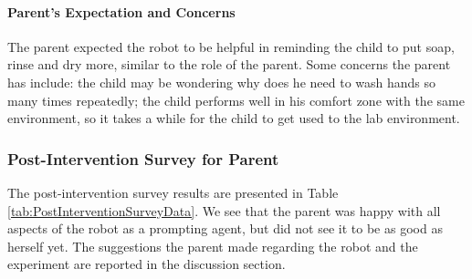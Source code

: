 \documentclass{ut-thesis}
\begin{document}
\paragraph{Parent's Expectation and Concerns}
The parent expected the robot to be helpful in reminding the child to put soap, rinse and dry more, similar to the role of the parent.  Some concerns the parent has include: the child may be wondering why does he need to wash hands so many times repeatedly; the child performs well in his comfort zone with the same environment, so it takes a while for the child to get used to the lab environment.


\subsubsection{Post-Intervention Survey for Parent}
The post-intervention survey results are presented in Table \ref{tab:PostInterventionSurveyData}.  We see that the parent was happy with all aspects of the robot as a prompting agent, but did not see it to be as good as herself yet.  The suggestions the parent made regarding the robot and the experiment are reported in the discussion section.
\end{document}
